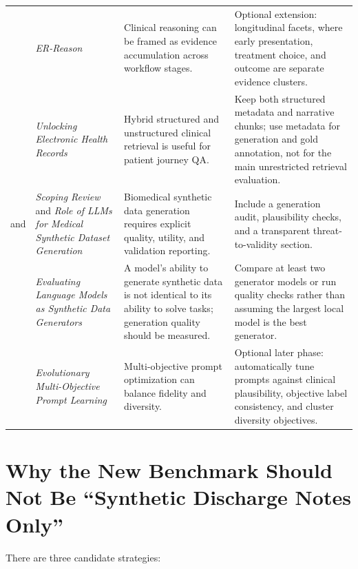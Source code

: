 \documentclass[11pt,a4paper]{article}
\begin{document}
\begin{longtable}{@{}p{2.25cm}p{3.65cm}p{4.2cm}p{4.6cm}@{}}
	\citet{mehandru2026erreason} & \emph{ER-Reason} & Clinical reasoning can be framed as evidence accumulation across workflow stages. & Optional extension: longitudinal facets, where early presentation, treatment choice, and outcome are separate evidence clusters.\\
	\citet{thio2026medigraf} & \emph{Unlocking Electronic Health Records} & Hybrid structured and unstructured clinical retrieval is useful for patient journey QA. & Keep both structured metadata and narrative chunks; use metadata for generation and gold annotation, not for the main unrestricted retrieval evaluation.\\
	\citet{rao2026scoping} and \citet{montenegro2025medicalsynthetic} & \emph{Scoping Review} and \emph{Role of LLMs for Medical Synthetic Dataset Generation} & Biomedical synthetic data generation requires explicit quality, utility, and validation reporting. & Include a generation audit, plausibility checks, and a transparent threat-to-validity section.\\
	\citet{kim2025agorabench} & \emph{Evaluating Language Models as Synthetic Data Generators} & A model's ability to generate synthetic data is not identical to its ability to solve tasks; generation quality should be measured. & Compare at least two generator models or run quality checks rather than assuming the largest local model is the best generator.\\
	\citet{pastrian2026evolutionary} & \emph{Evolutionary Multi-Objective Prompt Learning} & Multi-objective prompt optimization can balance fidelity and diversity. & Optional later phase: automatically tune prompts against clinical plausibility, objective label consistency, and cluster diversity objectives.\\
\end{longtable}

\section{Why the New Benchmark Should Not Be ``Synthetic Discharge Notes Only''}

There are three candidate strategies:
\end{document}
